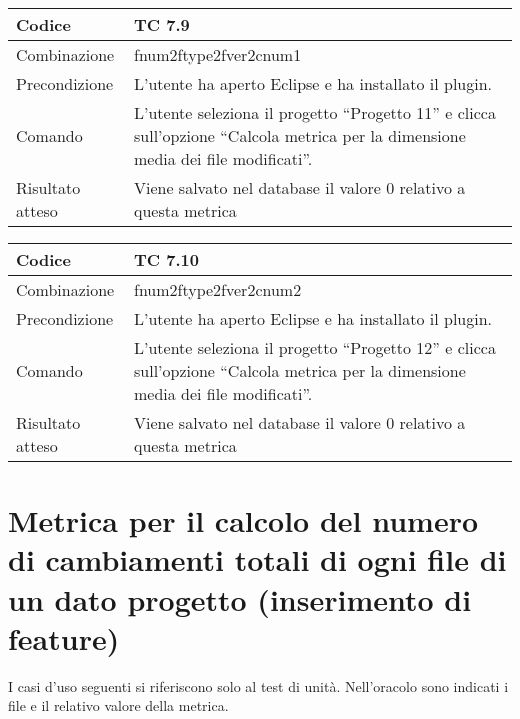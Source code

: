 \begin{table}[ht]
\begin{tabular}{|p{3cm}|p{9cm}|}
\hline
\cellcolor{lightgray}Codice				& TC 7.9								\\
\hline
\cellcolor{lightgray}Combinazione		& fnum2ftype2fver2cnum1 									\\
\hline
\cellcolor{lightgray}Precondizione		& L'utente ha aperto Eclipse e ha installato il plugin.								\\
\hline
\cellcolor{lightgray}Comando			& L'utente seleziona il progetto ``Progetto 11''  e clicca sull'opzione ``Calcola metrica per la dimensione media dei file modificati''.	\\
\hline
\cellcolor{lightgray}Risultato atteso	& Viene salvato nel database il valore 0 relativo a questa metrica	\\
\hline
\end{tabular}
\end{table}

\begin{table}[ht]
\begin{tabular}{|p{3cm}|p{9cm}|}
\hline
\cellcolor{lightgray}Codice				& TC 7.10								\\
\hline
\cellcolor{lightgray}Combinazione		& fnum2ftype2fver2cnum2 									\\
\hline
\cellcolor{lightgray}Precondizione		& L'utente ha aperto Eclipse e ha installato il plugin.									\\
\hline
\cellcolor{lightgray}Comando			& L'utente seleziona il progetto ``Progetto 12''  e clicca sull'opzione ``Calcola metrica per la dimensione media dei file modificati''.	\\
\hline
\cellcolor{lightgray}Risultato atteso	& Viene salvato nel database il valore 0 relativo a questa metrica	\\
\hline
\end{tabular}
\end{table}

\clearpage

\section{Metrica per il calcolo del numero di cambiamenti totali di ogni file di un dato progetto (inserimento di feature)}
I casi d'uso seguenti si riferiscono solo al test di unità. Nell'oracolo sono indicati i file e il relativo valore della metrica.\\

